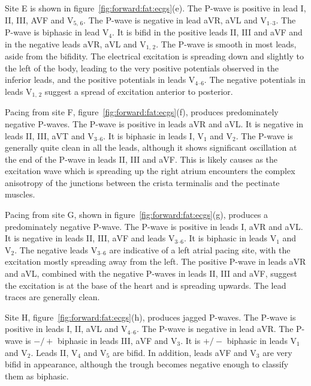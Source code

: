 Site E is shown in figure~\ref{fig:forward:fat:ecgs}(e).
The P-wave is positive in lead I, II, III, AVF and $\text{V}_{\text{5, 6}}$.
The P-wave is negative in lead aVR, aVL and $\text{V}_{\text{1--3}}$.
The P-wave is biphasic in lead $\text{V}_{\text{4}}$.
It is bifid in the positive leads II, III and aVF and in the negative leads aVR,
aVL and $\text{V}_{\text{1, 2}}$.
The P-wave is smooth in most leads, aside from the bifidity.
The electrical excitation is spreading down and slightly to the left of the
body, leading to the very positive potentials observed in the inferior leads,
and the positive potentials in leads $\text{V}_{\text{4--6}}$.
The negative potentials in leads $\text{V}_{\text{1, 2}}$ suggest a spread of
excitation anterior to posterior.

Pacing from site F, figure~\ref{fig:forward:fat:ecgs}(f), produces predominately
negative P-waves.
The P-wave is positive in leads aVR and aVL.
It is negative in leads II, III, aVT and $\text{V}_{\text{3--6}}$.
It is biphasic in leads I, $\text{V}_{\text{1}}$ and $\text{V}_{\text{2}}$.
The P-wave is generally quite clean in all the leads, although it shows
significant oscillation at the end of the P-wave in leads II, III and aVF.
This is likely causes as the excitation wave which is spreading up the right
atrium encounters the complex anisotropy of the junctions between the crista
terminalis and the pectinate muscles.


Pacing from site G, shown in figure~\ref{fig:forward:fat:ecgs}(g), produces a
predominately negative P-wave.
The P-wave is positive in leads I, aVR and aVL.
It is negative in leads II, III, aVF and leads $\text{V}_{\text{3--6}}$.
It is biphasic in leads $\text{V}_{\text{1}}$ and $\text{V}_{\text{2}}$.
The negative leads $\text{V}_{\text{3--6}}$ are indicative of a left atrial
pacing site, with the excitation mostly spreading away from the left.
The positive P-wave in leads aVR and aVL, combined with the negative P-waves in
leads II, III and aVF, suggest the excitation is at the base of the heart and is
spreading upwards.
The lead traces are generally clean.

Site H, figure~\ref{fig:forward:fat:ecgs}(h), produces jagged P-waves.
The P-wave is positive in leads I, II, aVL and $\text{V}_{\text{4--6}}$.
The P-wave is negative in lead aVR.
The P-wave is $-/+$ biphasic in leads III, aVF and $\text{V}_{\text{3}}$.
It is $+/-$ biphasic in leads $\text{V}_{\text{1}}$ and $\text{V}_{\text{2}}$.
Leads II, $\text{V}_{\text{4}}$ and $\text{V}_{\text{5}}$ are bifid.
In addition, leads aVF and $\text{V}_{\text{3}}$ are very bifid in appearance,
although the trough becomes negative enough to classify them as biphasic.

